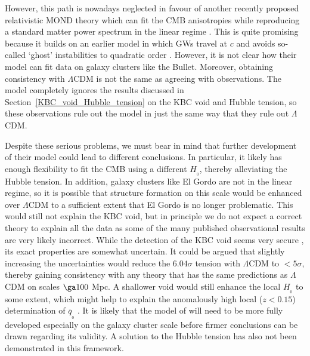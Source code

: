 \documentclass[fleqn,usenatbib,useAMS,onecolumn]{mnras} %
\begin{document}
However, this path is nowadays neglected in favour of another recently proposed relativistic MOND theory which can fit the CMB anisotropies while reproducing a standard matter power spectrum in the linear regime \citep{Skordis_2021}. This is quite promising because it builds on an earlier model in which GWs travel at $c$ \citep{Skordis_2019} and avoids so-called `ghost' instabilities to quadratic order \citep{Skordis_2021, Skordis_2021_stability}. However, it is not clear how their model can fit data on galaxy clusters like the Bullet. Moreover, obtaining consistency with $\Lambda$CDM is not the same as agreeing with observations. The model completely ignores the results discussed in Section~\ref{KBC_void_Hubble_tension} on the KBC void and Hubble tension, so these observations rule out the \citet{Skordis_2021} model in just the same way that they rule out $\Lambda$CDM.

Despite these serious problems, we must bear in mind that further development of their model could lead to different conclusions. In particular, it likely has enough flexibility to fit the CMB using a different $H_{_0}$, thereby alleviating the Hubble tension. In addition, galaxy clusters like El Gordo are not in the linear regime, so it is possible that structure formation on this scale would be enhanced over $\Lambda$CDM to a sufficient extent that El Gordo is no longer problematic. This would still not explain the KBC void, but in principle we do not expect a correct theory to explain all the data as some of the many published observational results are very likely incorrect. While the detection of the KBC void seems very secure \citep{Wong_2022}, its exact properties are somewhat uncertain. It could be argued that slightly increasing the uncertainties would reduce the $6.04\sigma$ tension with $\Lambda$CDM \citep{Haslbauer_2020} to $<5 \sigma$, thereby gaining consistency with any theory that has the same predictions as $\Lambda$CDM on scales $\ga 100$ Mpc. A shallower void would still enhance the local $H_{_0}$ to some extent, which might help to explain the anomalously high local ($z < 0.15$) determination of $\overline{q}_{_0}$ \citep[e.g.][]{Camarena_2020a, Camarena_2020b}. It is likely that the model of \citet{Skordis_2021} will need to be more fully developed especially on the galaxy cluster scale before firmer conclusions can be drawn regarding its validity. A solution to the Hubble tension has also not been demonstrated in this framework.
\end{document}
